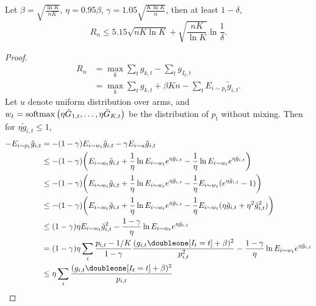 \begin{thm}
    Let $\beta=\sqrt{\frac{\ln K}{nK}}$, $\eta=0.95\beta$,
    $\gamma=1.05\sqrt{\frac{K\ln K}{n}}$, then \wprob at least $1-\delta$,
    \begin{equation}
        R_n\le 5.15\sqrt{nK\ln K} + \sqrt{\frac{nK}{\ln K}}\ln\frac{1}{\delta}.
    \end{equation}
\end{thm}
\begin{proof}
    \begin{align}
        R_n
            &= \max_k\sum_t g_{k,t} - \sum_t g_{I_t, t} \\
            &= \max_k\sum_t g_{k,t} + \beta K n - \sum_t E_{i\sim p_t}\tilde g_{i, t}.
    \end{align}
    Let $u$ denote uniform distribution over arms, and
    $w_t=\mathop{\mathrm{softmax}}\big(\eta\tilde G_{1,t},\dots,\eta\tilde G_{K,t}\big)$
    be the distribution of $p_t$ without mixing.
    Then for $\eta\tilde g_{i,t}\le 1$,
    \begin{align}
        - E_{i\sim p_t}\tilde g_{i, t}
            &= - (1-\gamma) E_{i\sim w_t} \tilde g_{i, t} - \gamma E_{i\sim u}\tilde g_{i, t}\\
            &\le - (1-\gamma)\bigg( E_{i\sim w_t} \tilde g_{i, t}
                +\frac{1}{\eta}\ln E_{i\sim w_t} e^{\eta\tilde g_{i,t}}
                -\frac{1}{\eta}\ln E_{i\sim w_t} e^{\eta\tilde g_{i,t}}
                \bigg) \\
            &\le - (1-\gamma)\bigg( E_{i\sim w_t} \tilde g_{i, t}
                +\frac{1}{\eta}\ln E_{i\sim w_t} e^{\eta\tilde g_{i,t}}
                -\frac{1}{\eta}E_{i\sim w_t} (e^{\eta\tilde g_{i,t}}-1)
                \bigg) \\
            &\le - (1-\gamma)\bigg( E_{i\sim w_t} \tilde g_{i, t}
                +\frac{1}{\eta}\ln E_{i\sim w_t} e^{\eta\tilde g_{i,t}}
                -\frac{1}{\eta}E_{i\sim w_t} (\eta\tilde g_{i,t} + \eta^2\tilde g_{i,t}^2)
                \bigg) \\
            &\le (1-\gamma)\eta
                E_{i\sim w_t} \tilde g_{i,t}^2
                - \frac{1-\gamma}{\eta} \ln E_{i\sim w_t} e^{\eta\tilde g_{i,t}} \\
            &= (1-\gamma)\eta
                \sum_{i}\frac{p_{i,t}-1/K}{1-\gamma} \frac{(g_{i,t}\doubleone[I_t=t]+\beta)^2}{p_{i,t}^2}
                - \frac{1-\gamma}{\eta} \ln E_{i\sim w_t} e^{\eta\tilde g_{i,t}} \\
            &\le \eta \sum_{i} \frac{(g_{i,t}\doubleone[I_t=t]+\beta)^2}{p_{i,t}}

\end{align}
\end{proof}
